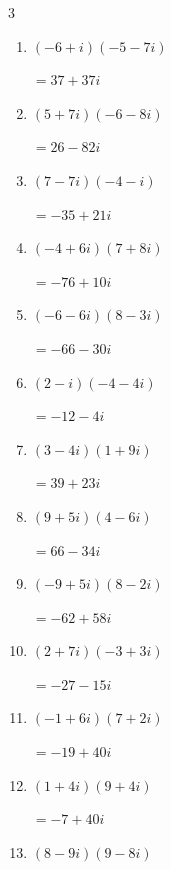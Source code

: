 \begin{multicols}{3}
\begin{enumerate}
        $\displaystyle =-15+80i$

  \item $\displaystyle (-6+i)(-5-7i)$

        $\displaystyle =37+37i$

  \item $\displaystyle (5+7i)(-6-8i)$

        $\displaystyle =26-82i$

  \item $\displaystyle (7-7i)(-4-i)$

        $\displaystyle =-35+21i$

  \item $\displaystyle (-4+6i)(7+8i)$

        $\displaystyle =-76+10i$

  \item $\displaystyle (-6-6i)(8-3i)$

        $\displaystyle =-66-30i$

\columnbreak %

\resetques

  \item $\displaystyle (2-i)(-4-4i)$

        $\displaystyle =-12-4i$

  \item $\displaystyle (3-4i)(1+9i)$

        $\displaystyle =39+23i$

  \item $\displaystyle (9+5i)(4-6i)$

        $\displaystyle =66-34i$

  \item $\displaystyle (-9+5i)(8-2i)$

        $\displaystyle =-62+58i$

  \item $\displaystyle (2+7i)(-3+3i)$

        $\displaystyle =-27-15i$

  \item $\displaystyle (-1+6i)(7+2i)$

        $\displaystyle =-19+40i$

  \item $\displaystyle (1+4i)(9+4i)$

        $\displaystyle =-7+40i$

  \item $\displaystyle (8-9i)(9-8i)$


\end{enumerate}
\end{multicols}
